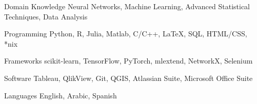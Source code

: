 


\begin{cvskills}
	
\cvskill
{Domain Knowledge}
{Neural Networks, Machine Learning, Advanced Statistical Techniques, Data Analysis}

\cvskill
{Programming} %
{Python, R,  Julia, Matlab, C/C++, \LaTeX , SQL, HTML/CSS, *nix} %

\cvskill
{Frameworks} %
{scikit-learn, TensorFlow, PyTorch, mlextend, NetworkX, Selenium} %

\cvskill
{Software} %
{Tableau, QlikView, Git, QGIS, Atlassian Suite, Microsoft Office Suite} %

\cvskill
{Languages} %
{English, Arabic, Spanish} %

\end{cvskills}
